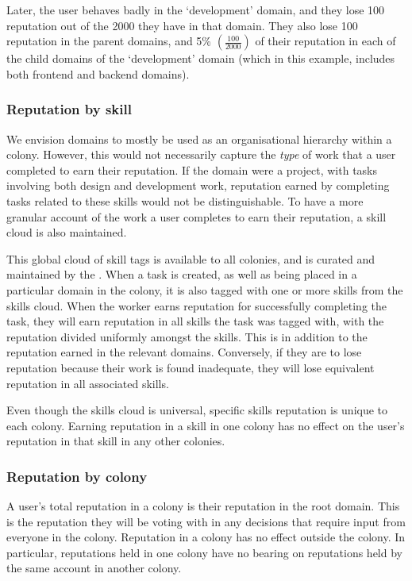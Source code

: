 Later, the user behaves badly in the `development' domain, and they lose 100 reputation out of the 2000 they have in that domain. They also lose 100 reputation in the parent domains, and 5\% $\left(\frac{100}{2000}\right)$ of their reputation in each of the child domains of the `development' domain (which in this example, includes both frontend and backend domains).

\subsubsection{Reputation by skill}\label{sec:rep-by-skill}

We envision domains to mostly be used as an organisational hierarchy within a colony. However, this would not necessarily capture the \emph{type} of work that a user completed to earn their reputation. If the domain were a project, with tasks involving both design and development work, reputation earned by completing tasks related to these skills would not be distinguishable. To have a more granular account of the work a user completes to earn their reputation, a skill cloud is also maintained.

This global cloud of skill tags is available to all colonies, and is curated and maintained by the \rc. When a task is created, as well as being placed in a particular domain in the colony, it is also tagged with one or more skills from the skills cloud. When the worker earns reputation for successfully completing the task, they will earn reputation in all skills the task was tagged with, with the reputation divided uniformly amongst the skills. This is in addition to the reputation earned in the relevant domains. Conversely, if they are to lose reputation because their work is found inadequate, they will lose equivalent reputation in all associated skills.

Even though the skills cloud is universal, specific skills reputation is unique to each colony. Earning reputation in a skill in one colony has no effect on the user's reputation in that skill in any other colonies.

\subsubsection{Reputation by colony}\label{sec:rep-by-colony}
A user's total reputation in a colony is their reputation in the root domain. This is the reputation they will be voting with in any decisions that require input from everyone in the colony. Reputation in a colony has no effect outside the colony. In particular, reputations held in one colony have no bearing on reputations held by the same account in another colony.

